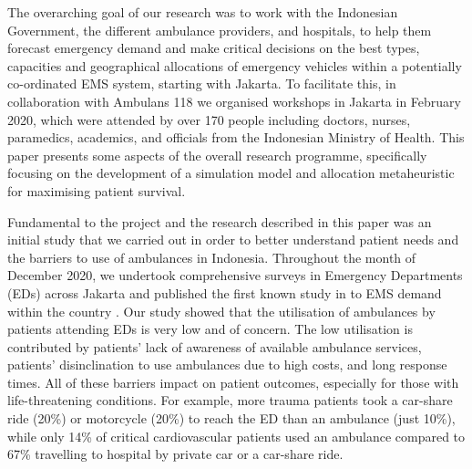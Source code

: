 \documentclass[numbers,webpdf,imaman]{ima-authoring-template}%
\begin{document}
The overarching goal of our research was to work with the Indonesian Government,
the different ambulance providers, and hospitals, to help them forecast
emergency demand and make critical decisions on the best types, capacities and
geographical allocations of emergency vehicles within a potentially co-ordinated
EMS system, starting with Jakarta. To facilitate this, in collaboration with
Ambulans 118 we organised workshops in Jakarta in February 2020, which were
attended by over 170 people including doctors, nurses, paramedics, academics,
and officials from the Indonesian Ministry of Health. This paper presents some
aspects of the overall research programme, specifically focusing on the
development of a simulation model and allocation metaheuristic for maximising
patient survival.  

Fundamental to the project and the research described in this paper was an
initial study that we carried out in order to better understand patient needs
and the barriers to use of ambulances in Indonesia. Throughout the month of
December 2020, we undertook comprehensive surveys in Emergency Departments
(EDs) across Jakarta and published the first known study in to EMS demand
within the country \citep{BriceSyaribahNoor2022Esui}. Our study showed that the
utilisation of ambulances by patients attending EDs is very low and of
concern. The low utilisation is contributed by patients' lack of awareness of
available ambulance services, patients' disinclination to use ambulances due to
high costs, and long response times.
All of these barriers impact on patient outcomes, especially for those with
life-threatening conditions. For example, more trauma patients took
a car-share ride (20\%) or motorcycle (20\%) to reach the ED than an ambulance
(just 10\%), while only 14\% of critical cardiovascular patients used an
ambulance compared to 67\% travelling to hospital by private car or a
car-share ride.
\end{document}
